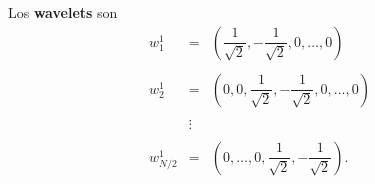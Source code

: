 Los \textbf{wavelets} son
$$
\begin{array}{rcl}
	w_1^1 &=&\left(\dfrac{1}{\sqrt{2}},-\dfrac{1}{\sqrt{2}},0,\ldots,0\right)\\\\
	w_2^1 &=& \left(0,0,\dfrac{1}{\sqrt{2}},-\dfrac{1}{\sqrt{2}},0,\ldots,0\right)\\\\
	&\vdots&\\\\
	w_{N/2}^1 &=& \left(0,\ldots,0,\dfrac{1}{\sqrt{2}},-\dfrac{1}{\sqrt{2}}\right).
\end{array}
$$




